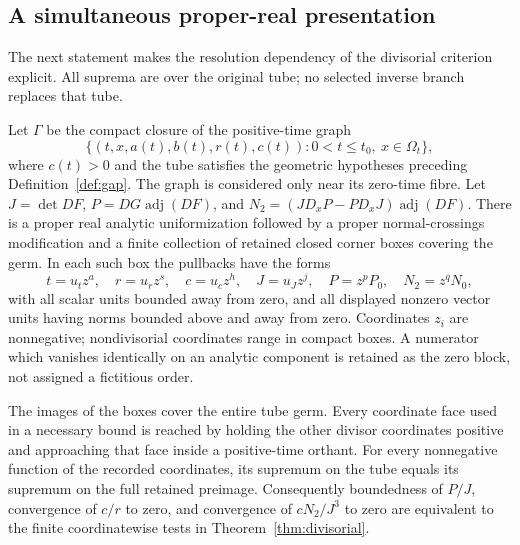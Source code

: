 \subsection{A simultaneous proper-real presentation}
The next statement makes the resolution dependency of the divisorial criterion explicit. All suprema are over the original tube; no selected inverse branch replaces that tube.

\begin{proposition}\label{prop:simultaneous}
Let $\Gamma$ be the compact closure of the positive-time graph
\[
 \{(t,x,a(t),b(t),r(t),c(t)):0<t\le t_0,\ x\in\Omega_t\},
\]
where $c(t)>0$ and the tube satisfies the geometric hypotheses preceding Definition~\ref{def:gap}. The graph is considered only near its zero-time fibre. Let $J=\det DF$, $P=DG\operatorname{adj}(DF)$, and
$N_2=(JD_xP-PD_xJ)\operatorname{adj}(DF)$.
There is a proper real analytic uniformization followed by a proper normal-crossings modification and a finite collection of retained closed corner boxes covering the germ. In each such box the pullbacks have the forms
\[
 t=u_tz^a,\quad r=u_rz^s,\quad c=u_cz^h,\quad J=u_Jz^j,
 \quad P=z^pP_0,\quad N_2=z^qN_0,
\]
with all scalar units bounded away from zero, and all displayed nonzero vector units having norms bounded above and away from zero. Coordinates $z_i$ are nonnegative; nondivisorial coordinates range in compact boxes. A numerator which vanishes identically on an analytic component is retained as the zero block, not assigned a fictitious order.

The images of the boxes cover the entire tube germ. Every coordinate face used in a necessary bound is reached by holding the other divisor coordinates positive and approaching that face inside a positive-time orthant. For every nonnegative function of the recorded coordinates, its supremum on the tube equals its supremum on the full retained preimage. Consequently boundedness of $P/J$, convergence of $c/r$ to zero, and convergence of $cN_2/J^3$ to zero are equivalent to the finite coordinatewise tests in Theorem~\ref{thm:divisorial}.
\end{proposition}
